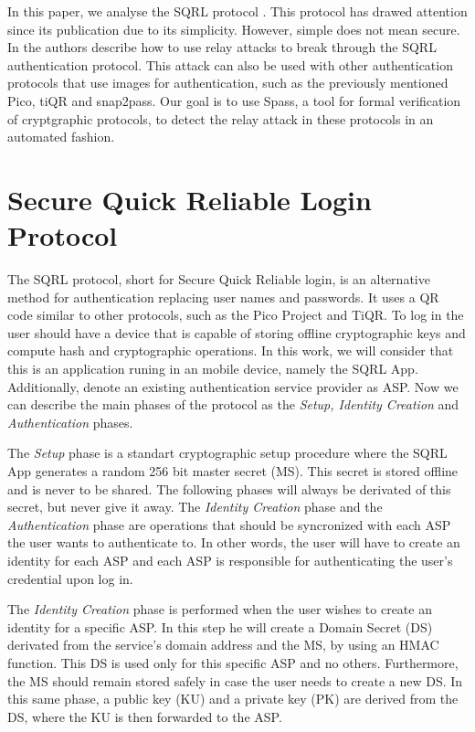 \documentclass{article}
\begin{document}
	In this paper, we analyse the SQRL protocol \cite{sqrl}. This protocol
	has drawed attention since its publication due to its simplicity. However,
	simple does not mean secure. In \cite{relayattack} the authors
	describe how to use relay attacks to break through the SQRL authentication
	protocol. This attack can also be used with other authentication
	protocols that use images for authentication, such as the previously mentioned
	Pico, tiQR and snap2pass.
	Our goal is to use Spass, a tool for formal verification of cryptgraphic
	protocols, to detect the relay attack in these protocols in an automated fashion.

\section{Secure Quick Reliable Login Protocol}

	The SQRL protocol, short for Secure Quick Reliable login, is an alternative method 
	for authentication replacing user names and passwords. It uses a QR code
	similar to other protocols, such as the Pico Project and TiQR. To log in
	the user should have a device that is capable of storing offline cryptographic
	keys and compute hash and cryptographic operations. In this work, we will consider that
	this is an application runing in an mobile device, namely the SQRL App. 
	Additionally, denote an existing authentication service provider as ASP. Now
	we can describe the main phases of the protocol as the \emph{Setup, Identity 
	Creation} and \emph{Authentication} phases.

	The \emph{Setup} phase is a standart cryptographic setup procedure where the
	SQRL App generates a random 256 bit master secret (MS). This secret is stored 
	offline and 
	is never to be shared. The following phases will always be derivated of this
	secret, but never give it away. The \emph{Identity Creation} phase and the
	\emph{Authentication} phase are operations that should be syncronized with
	each ASP the user wants to authenticate to. In other words, the user will
	have to create an identity for each ASP and each ASP is responsible 
	for authenticating the user's credential upon log in.

	The \emph{Identity Creation} phase is performed when the user wishes to create an
	identity for a specific ASP. In this step he will create a Domain Secret (DS)
	derivated from the service's domain address and the MS, by using an HMAC function.
	This DS is used only for this specific ASP and no others. Furthermore, the
	MS should remain stored safely in case the user needs to create a new DS. In 
	this same phase, a public key (KU) and a private key (PK) are derived from the
	DS, where the KU is then forwarded to the ASP.
\end{document}
